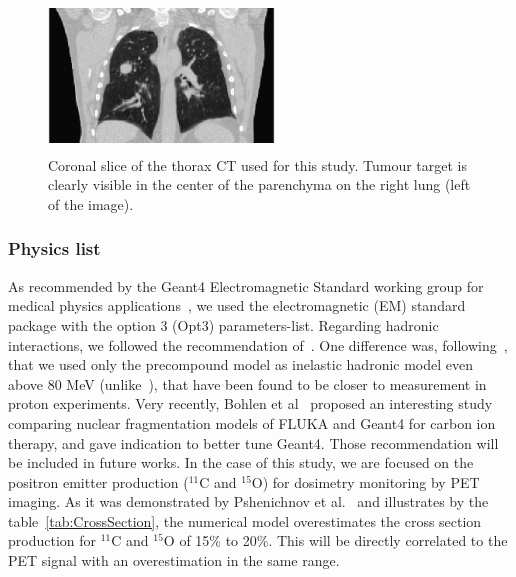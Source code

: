 \documentclass[11pt]{iopart}
\begin{document}
\begin{figure}[!h]
\centering
\includegraphics[width=6cm,height=40mm]{figures/phantomCT.jpg}
\caption{Coronal slice of the thorax CT used for this study. Tumour
  target is clearly visible in the center of the parenchyma on the
  right lung (left of the image).}
\label{fig00}
\end{figure}

\subsubsection{Physics list}

As recommended by the Geant4 Electromagnetic Standard working group
for medical physics applications~\cite{G4EMGroup2010}, we used the
electromagnetic (EM) standard package with the option 3 (Opt3)
parameters-list. Regarding hadronic interactions, we followed the
recommendation of~\cite{Pshenichnov2007, Zacharatou2008}. One
difference was, following~\cite{Polf2009, Peterson2009,
  Grevillot2010}, that we used only the precompound model as inelastic
hadronic model even above 80 MeV (unlike~\cite{Pshenichnov2007}), that
have been found to be closer to measurement in proton
experiments. Very recently, Bohlen et al~\cite{Bohlen2010} proposed an
interesting study comparing nuclear fragmentation models of FLUKA and
Geant4 for carbon ion therapy, and gave indication to better tune
Geant4. Those recommendation will be included in future works.  In the
case of this study, we are focused on the positron emitter production
($^{11}$C and $^{15}$O) for dosimetry monitoring by PET imaging. As it
was demonstrated by Pshenichnov et al.~\cite{Pshenichnov2006} and
illustrates by the table~\ref{tab:CrossSection}, the numerical model
overestimates the cross section production for $^{11}$C and $^{15}$O
of 15\% to 20\%. This will be directly correlated to the PET signal
with an overestimation in the same range.
\end{document}
